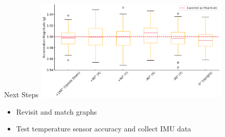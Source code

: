 \begin{frame}{Next Steps}
    \vspace{1em}
    \centering
    \includegraphics[width=0.7\textwidth,keepaspectratio]{images/orientation-boxplot.png}
    \vspace{1em}
    \begin{itemize}
        \item Revisit and match graphs
        \item Test temperature sensor accuracy and collect IMU data
    \end{itemize}
\end{frame}

